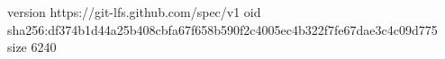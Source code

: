 version https://git-lfs.github.com/spec/v1
oid sha256:df374b1d44a25b408cbfa67f658b590f2c4005ec4b322f7fe67dae3c4c09d775
size 6240
